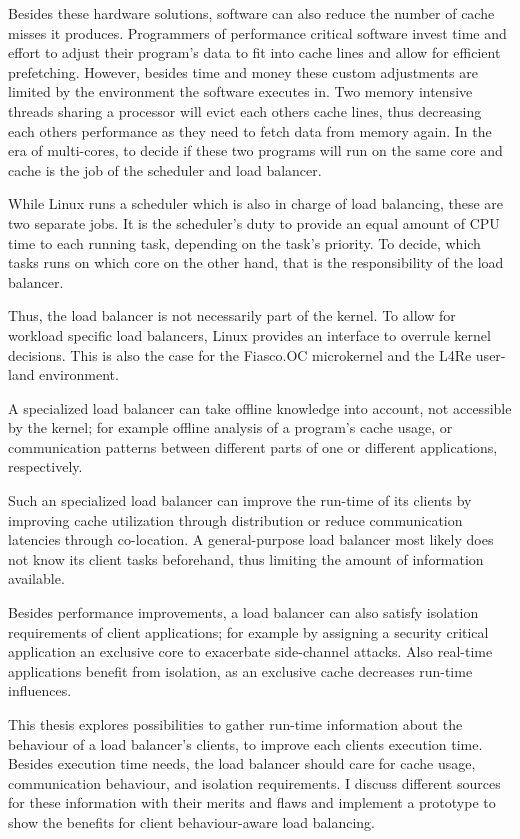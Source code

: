 Besides these hardware solutions, software can also reduce the number of cache
misses it produces.
Programmers of performance critical software invest time and effort to adjust
their program's data to fit into cache lines and allow for efficient prefetching.
However, besides time and money these custom adjustments are limited by the
environment the software executes in.
Two memory intensive threads sharing a processor will evict each others
cache lines, thus decreasing each others performance as they need to fetch
data from memory again.
In the era of multi-cores, to decide if these two programs will run on
the same core and cache is the job of the scheduler and load balancer.

While Linux runs a scheduler which is also in charge of load balancing, these
are two separate jobs.
It is the scheduler's duty to provide an equal amount of CPU time to each
running task, depending on the task's priority.
To decide, which tasks runs on which core on the other hand,
that is the responsibility of the load balancer.

Thus, the load balancer is not necessarily part of the kernel.
To allow for workload specific load balancers, Linux provides an interface to
overrule kernel decisions.
This is also the case for the Fiasco.OC microkernel and the L4Re user-land
environment.

A specialized load balancer can take offline knowledge into account, not
accessible by the kernel;
for example offline analysis of a program's cache usage, or communication
patterns between different parts of one or different applications,
respectively.

Such an specialized load balancer can improve the run-time of its clients by
improving cache utilization through distribution or reduce communication latencies
through co-location.
A general-purpose load balancer most likely does not know its client tasks
beforehand, thus limiting the amount of information available.

Besides performance improvements, a load balancer can also satisfy isolation
requirements of client applications; for example by assigning a security
critical application an exclusive core to exacerbate side-channel attacks.
Also real-time applications benefit from isolation, as an exclusive cache
decreases run-time influences.

This thesis explores possibilities to gather run-time information about the
behaviour of a load balancer's clients, to improve each clients execution time.
Besides execution time needs, the load balancer should care for cache usage,
communication behaviour, and isolation requirements.
I discuss different sources for these information with their merits and flaws and
implement a prototype to show the benefits for client behaviour-aware load
balancing.
\\

